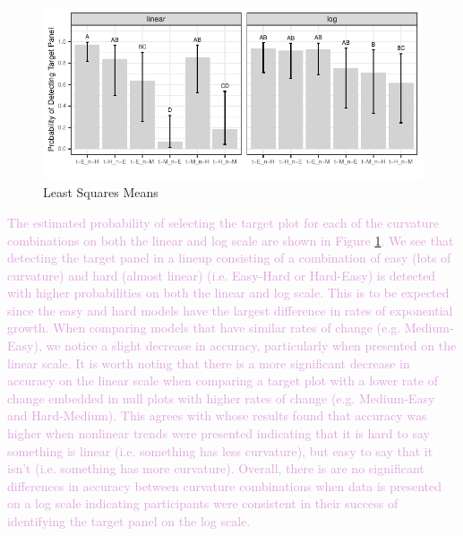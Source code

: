 \documentclass[]{interact}
\theoremstyle{plain}%
\theoremstyle{definition}
\theoremstyle{remark}
\begin{document}
\begin{figure}

{\centering \includegraphics{jsm-2021-student-paper-submission_files/figure-latex/lsmeans-plot-1} 

}

\caption{Least Squares Means}\label{fig:lsmeans-plot}
\end{figure}

\textcolor{Plum}{
The estimated probability of selecting the target plot for each of the curvature combinations on both the linear and log scale are shown in Figure \ref{fig:lsmeans-plot}. 
We see that detecting the target panel in a lineup consisting of a combination of easy (lots of curvature) and hard (almost linear) (i.e. Easy-Hard or Hard-Easy) is detected with higher probabilities on both the linear and log scale. 
This is to be expected since the easy and hard models have the largest difference in rates of exponential growth.
When comparing models that have similar rates of change (e.g. Medium-Easy), we notice a slight decrease in accuracy, particularly when presented on the linear scale. 
It is worth noting that there is a more significant decrease in accuracy on the linear scale when comparing a target plot with a lower rate of change embedded in null plots with higher rates of change (e.g. Medium-Easy and Hard-Medium). 
This agrees with \cite{best_perception_2007} whose results found that accuracy was higher when nonlinear trends were presented indicating that it is hard to say something is linear (i.e. something has less curvature), but easy to say that it isn't (i.e. something has more curvature). 
Overall, there is are no significant differences in accuracy between curvature combinations when data is presented on a log scale indicating participants were consistent in their success of identifying the target panel on the log scale. 
}
\end{document}
